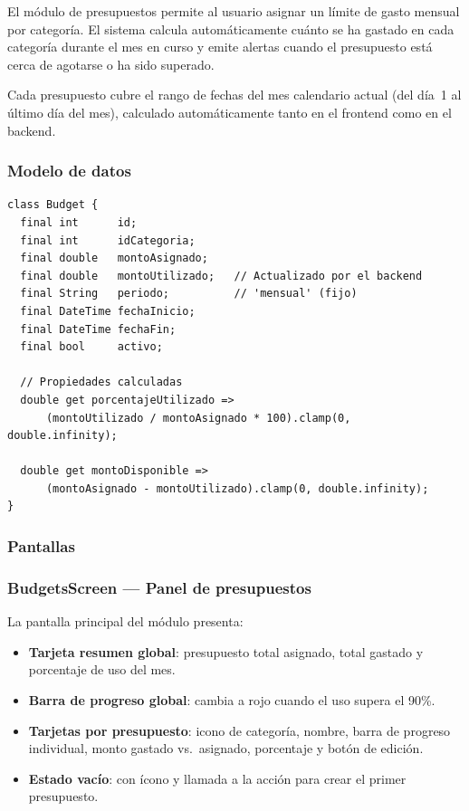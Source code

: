 El módulo de presupuestos permite al usuario asignar un límite de gasto
mensual por categoría. El sistema calcula automáticamente cuánto se ha
gastado en cada categoría durante el mes en curso y emite alertas cuando
el presupuesto está cerca de agotarse o ha sido superado.

Cada presupuesto cubre el rango de fechas del mes calendario actual
(del día~1 al último día del mes), calculado automáticamente tanto en el
frontend como en el backend.

\subsubsection{Modelo de datos}

\begin{lstlisting}[style=dart,
    caption={Modelo de datos Budget en Flutter}]
class Budget {
  final int      id;
  final int      idCategoria;
  final double   montoAsignado;
  final double   montoUtilizado;   // Actualizado por el backend
  final String   periodo;          // 'mensual' (fijo)
  final DateTime fechaInicio;
  final DateTime fechaFin;
  final bool     activo;

  // Propiedades calculadas
  double get porcentajeUtilizado =>
      (montoUtilizado / montoAsignado * 100).clamp(0, double.infinity);

  double get montoDisponible =>
      (montoAsignado - montoUtilizado).clamp(0, double.infinity);
}
\end{lstlisting}

\subsubsection{Pantallas}

\subsubsection*{BudgetsScreen — Panel de presupuestos}

La pantalla principal del módulo presenta:

\begin{itemize}
  \item \textbf{Tarjeta resumen global}: presupuesto total asignado,
        total gastado y porcentaje de uso del mes.
  \item \textbf{Barra de progreso global}: cambia a rojo cuando el uso
        supera el 90\%.
  \item \textbf{Tarjetas por presupuesto}: icono de categoría, nombre,
        barra de progreso individual, monto gastado vs.\ asignado,
        porcentaje y botón de edición.
  \item \textbf{Estado vacío}: con ícono y llamada a la acción para
        crear el primer presupuesto.
\end{itemize}

